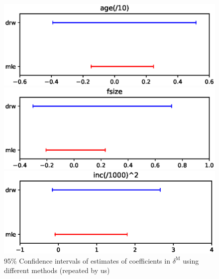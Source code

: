 \documentclass{article}
\begin{document}
\begin{figure}
\begin{minipage}{0.48\linewidth}
\end{minipage}
\begin{minipage}{0.48\linewidth}
\includegraphics[width=\linewidth]{3.eps}
\end{minipage}
\begin{minipage}{0.48\linewidth}
\includegraphics[width=\linewidth]{4.eps}
\end{minipage}
\begin{minipage}{0.48\linewidth}
\includegraphics[width=\linewidth]{5.eps}
\end{minipage}
\caption{95\% Confidence intervals of estimates of coefficients in $\delta^{\mathrm{M}}$ using different methods (repeated by us)}
\label{ourci}
\end{figure}
\end{document}
